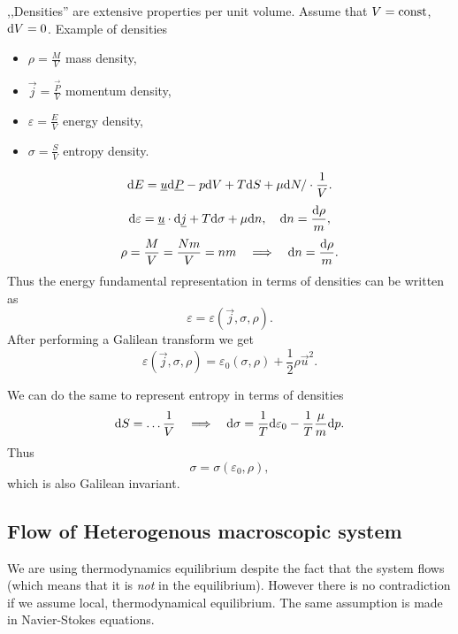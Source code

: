 \documentclass[../main.tex]{subfiles}
\begin{document}
    ,,Densities'' are extensive properties per unit volume.
    Assume that $V = \textrm{const}$, $\mathrm{d} V = 0$.
    Example of densities
    \begin{itemize}
      \item $\rho = \frac{M}{V}$ mass density,
      \item $\vec j = \frac{\vec P}{V}$ momentum density,
      \item $\varepsilon = \frac{E}{V}$ energy density,
      \item $\sigma = \frac{S}{V}$ entropy density.
    \end{itemize}
    \begin{displaymath}
      \mathrm{d} E = \underline{u} \mathrm{d} \underline{P} - p \mathrm{d} V + T \mathrm{d} S + \mu \mathrm{d} N / \cdot \frac{1}{V}.
    \end{displaymath}
    \begin{displaymath}
      \mathrm{d} \varepsilon = \underline{u} \cdot \mathrm{d} \underline{j} + T \mathrm{d} \sigma + \mu\mathrm{d} n, \quad \mathrm{d} n = \frac{\mathrm{d} \rho}{m},
    \end{displaymath}
    \begin{displaymath}
      \rho = \frac{M}{V} = \frac{Nm}{V} = nm \quad \Longrightarrow \quad \mathrm{d} n = \frac{\mathrm{d} \rho}{m}.
    \end{displaymath}
    Thus the energy fundamental representation in terms of densities can be written as
    \begin{displaymath}
      \varepsilon = \varepsilon(\vec j, \sigma, \rho).
    \end{displaymath}
    After performing a Galilean transform we get
    \begin{displaymath}
      \varepsilon(\vec j, \sigma, \rho) = \varepsilon_0(\sigma, \rho) + \frac{1}{2} \rho \vec u ^2.
    \end{displaymath}
    
    We can do the same to represent entropy in terms of densities
    \begin{displaymath}
      \mathrm{d} S = \dots \frac{1}{V} \quad \Longrightarrow \quad  \mathrm{d} \sigma = \frac{1}{T} \mathrm{d} \varepsilon_0 - \frac{1}{T} \frac{\mu}{m} \mathrm{d} p.
    \end{displaymath}
    Thus
    \begin{displaymath}
      \sigma = \sigma(\varepsilon_0, \rho),
    \end{displaymath}
    which is also Galilean invariant.


    \subsection{Flow of Heterogenous macroscopic system}
    We are using thermodynamics equilibrium despite the fact that the system flows (which means that it is \emph{not} in the equilibrium).
    However there is no contradiction if we assume local, thermodynamical equilibrium.
    The same assumption is made in Navier-Stokes equations.
\end{document}
